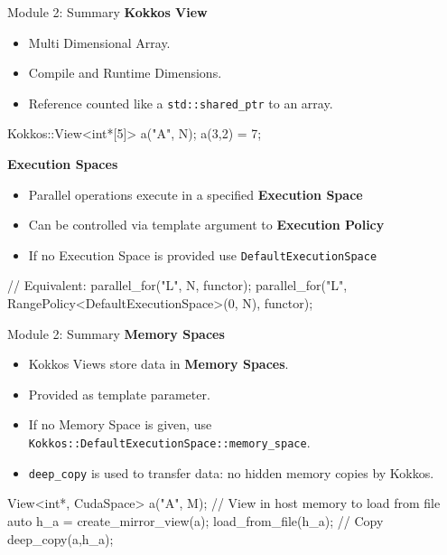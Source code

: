 





\begin{frame}[fragile]{Module 2: Summary}
	\textbf{Kokkos View}
	\begin{itemize}
		\item Multi Dimensional Array.
		\item Compile and Runtime Dimensions.
		\item Reference counted like a \texttt{std::shared\_ptr} to an array.
	\end{itemize}
\begin{code}[keywords={View,int}]
	Kokkos::View<int*[5]> a("A", N);
	a(3,2) = 7;
\end{code}

	\textbf{Execution Spaces}
	\begin{itemize}
		\item{Parallel operations execute in a specified \textbf{Execution Space}}
		\item{Can be controlled via template argument to \textbf{Execution Policy}}
		\item{If no Execution Space is provided use \texttt{DefaultExecutionSpace}}
	\end{itemize}
\begin{code}[keywords={parallel_for,Cuda,RangePolicy}]
// Equivalent:
parallel_for("L", N, functor);
parallel_for("L",
  RangePolicy<DefaultExecutionSpace>(0, N), functor);
\end{code}
\end{frame}

\begin{frame}[fragile]{Module 2: Summary}
	\textbf{Memory Spaces}
	\begin{itemize}
		\item Kokkos Views store data in \textbf{Memory Spaces}.
		\item Provided as template parameter.
		\item If no Memory Space is given, use  \texttt{Kokkos::DefaultExecutionSpace::memory\_space}.
		\item \texttt{deep\_copy} is used to transfer data: no hidden memory copies by Kokkos.
	\end{itemize}
\begin{code}[keywords={View,int,CudaSpace,create_mirror_view}]
	View<int*, CudaSpace> a("A", M);
	// View in host memory to load from file
	auto h_a = create_mirror_view(a);
        load_from_file(h_a);
	// Copy
	deep_copy(a,h_a);
\end{code}

\end{frame}

